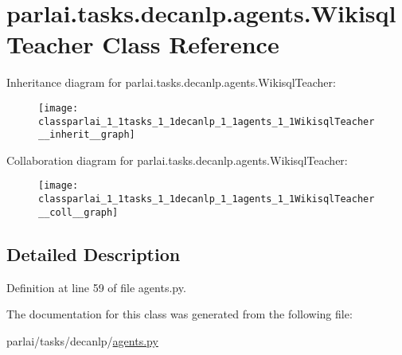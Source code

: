 \hypertarget{classparlai_1_1tasks_1_1decanlp_1_1agents_1_1WikisqlTeacher}{}\section{parlai.\+tasks.\+decanlp.\+agents.\+Wikisql\+Teacher Class Reference}
\label{classparlai_1_1tasks_1_1decanlp_1_1agents_1_1WikisqlTeacher}


Inheritance diagram for parlai.\+tasks.\+decanlp.\+agents.\+Wikisql\+Teacher\+:
\nopagebreak
\begin{figure}[H]
\begin{center}
\leavevmode
\texttt{[image: classparlai\_1\_1tasks\_1\_1decanlp\_1\_1agents\_1\_1WikisqlTeacher\_\_inherit\_\_graph]}
\end{center}
\end{figure}


Collaboration diagram for parlai.\+tasks.\+decanlp.\+agents.\+Wikisql\+Teacher\+:
\nopagebreak
\begin{figure}[H]
\begin{center}
\leavevmode
\texttt{[image: classparlai\_1\_1tasks\_1\_1decanlp\_1\_1agents\_1\_1WikisqlTeacher\_\_coll\_\_graph]}
\end{center}
\end{figure}


\subsection{Detailed Description}


Definition at line 59 of file agents.\+py.



The documentation for this class was generated from the following file\+:\begin{DoxyCompactItemize}
\item 
parlai/tasks/decanlp/\hyperlink{parlai_2tasks_2decanlp_2agents_8py}{agents.\+py}\end{DoxyCompactItemize}
